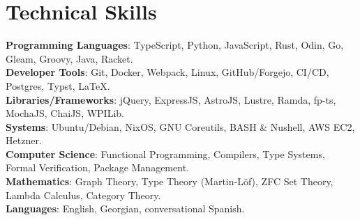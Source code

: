 \documentclass[letterpaper,11pt]{article}
\begin{document}
\section{Technical Skills}
 \begin{itemize}[leftmargin=0.15in, label={}]
    \small{\item{
     \textbf{Programming Languages}{: TypeScript, Python, JavaScript, Rust, Odin, Go, Gleam, Groovy, Java, Racket.} \\
     \textbf{Developer Tools}{: Git, Docker, Webpack, Linux, GitHub/Forgejo, CI/CD, Postgres, Typst, LaTeX.} \\
     \textbf{Libraries/Frameworks}{: jQuery, ExpressJS, AstroJS, Lustre, Ramda, fp-ts, MochaJS, ChaiJS, WPILib.} \\
     \textbf{Systems}{: Ubuntu/Debian, NixOS, GNU Coreutils, BASH \& Nushell, AWS EC2, Hetzner.} \\
     \textbf{Computer Science}{: Functional Programming, Compilers, Type Systems, Formal Verification, Package Management.} \\
     \textbf{Mathematics}{: Graph Theory, Type Theory (Martin-Löf), ZFC Set Theory, Lambda Calculus, Category Theory.} \\
     \textbf{Languages}{: English, Georgian, conversational Spanish.}
    }}
 \end{itemize}
\end{document}

